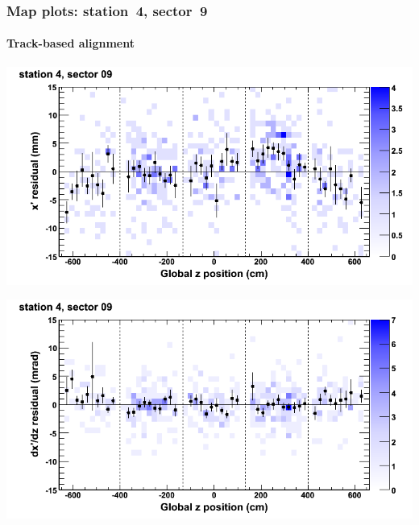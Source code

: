 \documentclass[compress]{beamer}
\begin{document}
\begin{frame}
\frametitle{Map plots: station~4, sector~9}
\framesubtitle{Track-based alignment}
\includegraphics[width=0.5\linewidth]{mapplots_re05/DTvsz_st4sec09_x.png}

\includegraphics[width=0.5\linewidth]{mapplots_re05/DTvsz_st4sec09_dxdz.png}
\end{frame}
\end{document}
